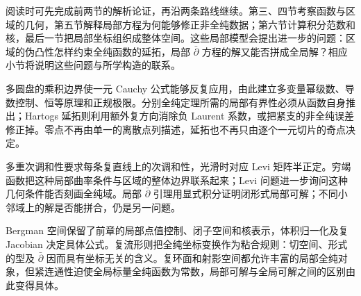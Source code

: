\ProseParagraphBreak

阅读时可先完成前两节的解析论证，再沿两条路线继续。第三、四节考察函数与区域的几何，第五节解释局部方程为何能够修正非全纯数据；第六节计算积分范数和核，最后一节把局部坐标组织成整体空间。这些局部模型会提出进一步的问题：区域的伪凸性怎样约束全纯函数的延拓，局部 \(\bar\partial\) 方程的解又能否拼成全局解？相应小节将说明这些问题与所学构造的联系。









\begin{chaptersummary}
多圆盘的乘积边界使一元 Cauchy 公式能够反复应用，由此建立多变量幂级数、导数控制、恒等原理和正规极限。分别全纯定理所需的局部有界性必须从函数自身推出；Hartogs 延拓则利用额外复方向消除负 Laurent 系数，或把紧支的非全纯误差修正掉。零点不再由单一的离散点列描述，延拓也不再只由逐个一元切片的奇点决定。

多重次调和性要求每条复直线上的次调和性，光滑时对应 Levi 矩阵半正定。穷竭函数把这种局部曲率条件与区域的整体边界联系起来；Levi 问题进一步询问这种几何条件能否刻画全纯域。局部 \(\bar\partial\) 引理用显式积分证明闭形式局部可解；不同小邻域上的解是否能拼合，仍是另一问题。

Bergman 空间保留了前章的局部点值控制、闭子空间和核表示，体积归一化及复 Jacobian 决定具体公式。复流形则把全纯坐标变换作为粘合规则：切空间、形式的型及 \(\bar\partial\) 因而具有坐标无关的含义。复环面和射影空间都允许丰富的局部全纯对象，但紧连通性迫使全局标量全纯函数为常数，局部可解与全局可解之间的区别由此变得具体。
\end{chaptersummary}

\BookExercises


